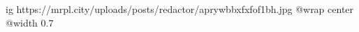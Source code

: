  
 
 
 
 

\ifcmt
  ig https://mrpl.city/uploads/posts/redactor/aprywbbxfxfof1bh.jpg
  @wrap center
  @width 0.7
\fi
